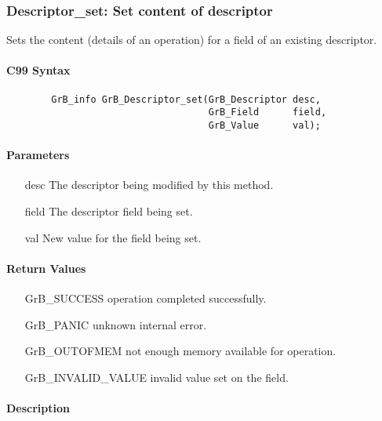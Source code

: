 \subsubsection{{\sf Descriptor\_set}: Set content of descriptor}

Sets the content (details of an operation) for a field of an existing
descriptor.

\paragraph{C99 Syntax}

\begin{verbatim}
        GrB_info GrB_Descriptor_set(GrB_Descriptor desc,
                                    GrB_Field      field,
                                    GrB_Value      val);
\end{verbatim}

\paragraph{Parameters}

\begin{itemize}[leftmargin=1.1in]
    \item[{\sf desc}]  The descriptor being modified by this method.
    \item[{\sf field}] The descriptor field being set.
    \item[{\sf val}]   New value for the field being set.
\end{itemize}

\paragraph{Return Values}

\begin{itemize}[leftmargin=2.1in]
\item[{\sf GrB\_SUCCESS}]           operation completed successfully.
\item[{\sf GrB\_PANIC}]             unknown internal error.
\item[{\sf GrB\_OUTOFMEM}]          not enough memory available for operation.
\item[{\sf GrB\_INVALID\_VALUE}]    invalid value set on the field.
\end{itemize}

\paragraph{Description}

